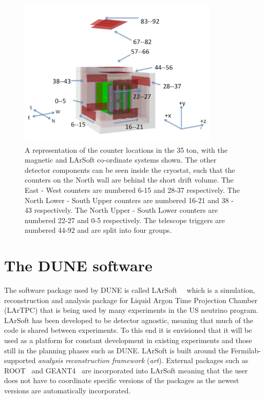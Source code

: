 \begin{figure}[h]
  \centering
  \includegraphics[width=0.85\textwidth]{35tonFullDetect}
  \caption[A representation of the counter locations in the 35 ton]
          {A representation of the counter locations in the 35 ton, with the magnetic and LArSoft co-ordinate systems shown. The other detector components can be seen inside the cryostat, such that the counters on the North wall are behind the short drift volume. The East - West counters are numbered 6-15 and 28-37 respectively. The North Lower - South Upper counters are numbered 16-21 and 38 - 43 respectively. The North Upper - South Lower counters are numbered 22-27 and 0-5 respectively. The telescope triggers are numbered 44-92 and are split into four groups.}
  \label{fig:35tonCounterLoc}
\end{figure}

\section{The DUNE software} \label{sec:LArSoft} %
The software package used by DUNE is called LArSoft~\citep{Church_LArSoft}~\citep{LArSoftOrg} which is a simulation, reconstruction and analysis package for Liquid Argon Time Projection Chamber (LArTPC) that is being used by many experiments in the US neutrino program. LArSoft has been developed to be detector agnostic, meaning that much of the code is shared between experiments. To this end it is envisioned that it will be used as a platform for constant development in existing experiments and those still in the planning phases such as DUNE. LArSoft is built around the Fermilab-supported \emph{analysis reconstruction framework} (\emph{art}). External packages such as ROOT~\citep{ROOT} and GEANT4~\citep{GEANT4} are incorporated into LArSoft meaning that the user does not have to coordinate specific versions of the packages as the newest versions are automatically incorporated. \\

